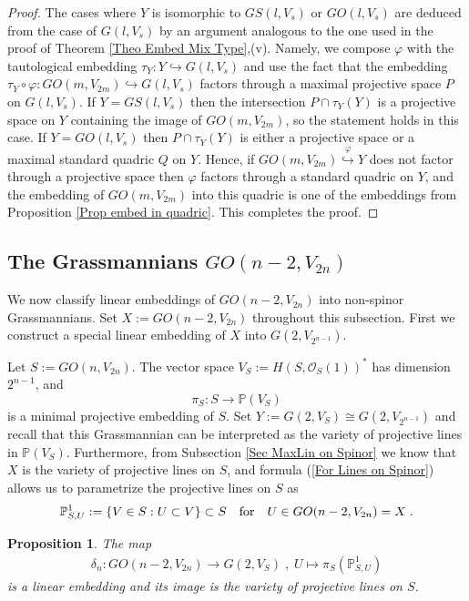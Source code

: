 \documentclass[12pt]{amsart}
\def\PP {{\mathbb P}}     %
\def\mc {\mathcal}
\newtheorem{prop}[theorem]{Proposition}
\begin{document}
\begin{proof}
The cases where $Y$ is isomorphic to $GS(l,V_s)$ or $GO(l,V_s)$ are deduced from the case of $G(l,V_s)$ by an argument analogous to the one used in the proof of Theorem \ref{Theo Embed Mix Type},(v). Namely, we compose $\varphi$ with the tautological embedding $\tau_Y:Y\hookrightarrow G(l,V_s)$ and use the fact that the embedding $\tau_Y\circ \varphi:GO(m,V_{2m})\hookrightarrow G(l,V_s)$ factors through a maximal projective space $P$ on $G(l,V_s)$. If $Y= GS(l,V_s)$ then the intersection $P\cap\tau_Y(Y)$ is a projective space on $Y$ containing the image of $GO(m,V_{2m})$, so the statement holds in this case. If $Y= GO(l,V_s)$ then $P\cap\tau_Y(Y)$ is either a projective space or a maximal standard quadric $Q$ on $Y$. Hence, if $GO(m,V_{2m}) \stackrel{\varphi}{\hookrightarrow} Y$ does not factor through a projective space then $\varphi$ factors through a standard quadric on $Y$, and the embedding of $GO(m,V_{2m})$ into this quadric is one of the embeddings from Proposition \ref{Prop embed in quadric}. This completes the proof.
\end{proof}


\subsection{The Grassmannians $GO(n-2,V_{2n})$}\label{Sec GOnminus22n G2Spin}

We now classify linear embeddings of $GO(n-2,V_{2n})$ into non-spinor Grassmannians. Set $X:=GO(n-2,V_{2n})$ throughout this subsection. First we construct a special linear embedding of $X$ into $G(2,V_{2^{n-1}})$.

Let $S:=GO(n,V_{2n})$. The vector space $V_S:=H(S,\mc O_S(1))^*$ has dimension $2^{n-1}$, and
$$
\pi_S:S\to \PP(V_{S})
$$
is a minimal projective embedding of $S$. Set $Y:=G(2,V_S)\cong G(2,V_{2^{n-1}})$ and recall that this Grassmannian can be interpreted as the variety of projective lines in $\PP(V_S)$. Furthermore, from Subsection \ref{Sec MaxLin on Spinor} we know that $X$ is the variety of projective lines on $S$, and formula (\ref{For Lines on Spinor}) allows us to parametrize the projective lines on $S$ as
$$
\PP^1_{S,U} :=\{V\in S: U\subset V\} \subset S \quad {\rm for} \quad U\in GO(n-2,V_{2n})= X \;.
$$

\begin{prop}\label{Prop special emb delta n}
The map 
\begin{gather}\label{For special emb delta n}
\delta_n:GO(n-2,V_{2n})\to G(2,V_S)\;,\; U\mapsto \pi_S(\PP^{1}_{S,U})
\end{gather}
is a linear embedding and its image is the variety of projective lines on $S$.
\end{prop}
\end{document}

